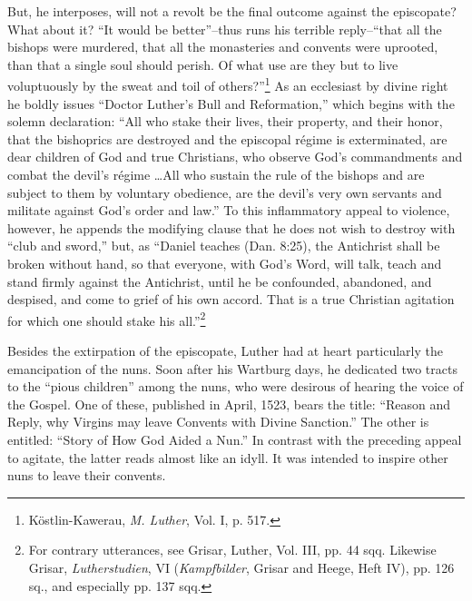 But, he interposes, will not a revolt be the final outcome
against the episcopate? What about it? “It would be better”--thus runs his
terrible reply--“that all the bishops were murdered, that all the monasteries
and convents were uprooted, than that a single soul should perish. Of what
use are they but to live voluptuously by the sweat and toil of others?”\footnote
{Köstlin-Kawerau, \textit{M. Luther}, Vol. I, p. 517.}
As an ecclesiast by divine right he boldly issues “Doctor Luther’s Bull and
Reformation,” which begins with the solemn declaration: “All who stake
their lives, their property, and their honor, that the bishoprics are destroyed
and the episcopal régime is exterminated, are dear children of God and
true Christians, who observe God’s commandments and combat the devil’s
régime \dots All who sustain the rule of the bishops and are subject to
them by voluntary obedience, are the devil’s very own servants and militate
against God’s order and law.” To this inflammatory appeal to violence,
however, he appends the modifying clause that he does not wish to destroy
with “club and sword,” but, as “Daniel teaches (Dan. 8:25), the Antichrist
shall be broken without hand, so that everyone, with God’s Word, will talk,
teach and stand firmly against the Antichrist, until he be confounded,
abandoned, and despised, and come to grief of his own accord. That is a true
Christian agitation for which one should stake his all.”\footnote
{For contrary utterances, see Grisar, Luther, Vol. III, pp. 44 sqq. Likewise Grisar,
\textit{Lutherstudien}, VI (\textit{Kampfbilder}, Grisar and Heege, Heft IV), pp. 126 sq., and especially
pp. 137 sqq.}

Besides the extirpation of the episcopate, Luther had at heart
particularly the emancipation of the nuns. Soon after his Wartburg
days, he dedicated two tracts to the “pious children” among the
nuns, who were desirous of hearing the voice of the Gospel. One of
these, published in April, 1523, bears the title: “Reason and Reply,
why Virgins may leave Convents with Divine Sanction.” The other
is entitled: “Story of How God Aided a Nun.” In contrast with the
preceding appeal to agitate, the latter reads almost like an idyll. It
was intended to inspire other nuns to leave their convents.

